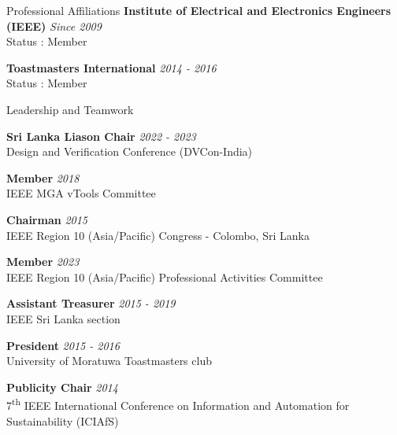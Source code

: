 \documentclass[
11pt, %
]{./assets/resume} %
\begin{document}
\begin{rSection}{Professional Affiliations}
	\textbf{Institute of Electrical and Electronics Engineers (IEEE)} \hfill \textit{Since 2009}\\
	Status : Member
	
	
	\textbf{Toastmasters International} \hfill \textit{2014 - 2016}\\
	Status : Member
	
\end{rSection}


\begin{rSection}{Leadership and Teamwork}

\textbf{Sri Lanka Liason Chair} \hfill \textit{2022 - 2023} \\
Design and Verification Conference (DVCon-India)


\textbf{Member} \hfill \textit{2018} \\
IEEE MGA vTools Committee


\textbf{Chairman} \hfill \textit{2015} \\
IEEE Region 10 (Asia/Pacific) Congress - Colombo, Sri Lanka


\textbf{Member} \hfill \textit{2023} \\
IEEE Region 10 (Asia/Pacific) Professional Activities Committee

\textbf{Assistant Treasurer} \hfill \textit{2015 - 2019}\\
IEEE Sri Lanka section

\textbf{President} \hfill \textit{2015 - 2016} \\
University of Moratuwa Toastmasters club

\textbf{Publicity Chair} \hfill \textit{2014} \\
7\textsuperscript{th} IEEE International Conference on Information and Automation for Sustainability (ICIAfS)

\end{rSection}
\end{document}
